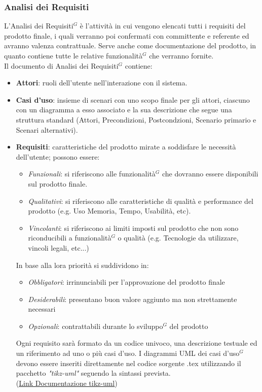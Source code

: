 \documentclass[a4paper,10pt]{article}
\begin{document}
\subsubsection{Analisi dei Requisiti}
L'Analisi dei Requisiti$^G$ è l'attività in cui vengono elencati tutti i requisiti del prodotto finale,
i quali verranno poi confermati con committente e referente ed avranno valenza contrattuale.
Serve anche come documentazione del prodotto, in quanto contiene tutte le relative funzionalità$^G$ che verranno fornite. \\
Il documento di Analisi dei Requisiti$^G$ contiene: 
\begin{itemize}
  \item \textbf{Attori}: ruoli dell'utente nell'interazione con il sistema.
  \item \textbf{Casi d'uso}: insieme di scenari con uno scopo finale per gli attori, ciascuno con un diagramma a esso 
  associato e la sua descrizione che segue una struttura standard 
  (Attori, Precondizioni, Postcondzioni, Scenario primario e Scenari alternativi).
  \item \textbf{Requisiti}: caratteristiche del prodotto mirate a soddisfare le necessità dell'utente; 
  possono essere:
  \begin{itemize}
    \item \textit{Funzionali}: si riferiscono alle funzionalità$^G$ che dovranno essere disponibili sul prodotto finale.
    \item \textit{Qualitativi}: si riferiscono alle caratteristiche di qualità e performance del prodotto 
    (e.g. Uso Memoria, Tempo, Usabilità, etc).
    \item \textit{Vincolanti}: si riferiscono ai limiti imposti sul prodotto che non sono riconducibili a funzionalità$^G$ o qualità 
    (e.g. Tecnologie da utilizzare, vincoli legali, etc...)
  \end{itemize}
  In base alla lora priorità si suddividono in:
  \begin{itemize}
  \item \textit{Obbligatori}: irrinunciabili per l'approvazione del prodotto finale
  \item \textit{Desiderabili}: presentano buon valore aggiunto ma non strettamente necessari 
  \item \textit{Opzionali}: contrattabili durante lo sviluppo$^G$ del prodotto
  \end{itemize}
  Ogni requisito sarà formato da un codice univoco, una descrizione testuale ed un riferimento ad uno o più casi d'uso.
  I diagrammi UML dei casi d'uso$^G$ devono essere inseriti direttamente nel codice sorgente .tex utilizzando il pacchetto
  \textit{"tikz-uml"} seguendo la sintassi prevista. \\
  (\href{https://perso.ensta.fr/~kielbasi/tikzuml/var/files/doc/tikzumlmanual.pdf}{\underline{Link Documentazione tikz-uml}})

\end{itemize}
\end{document}
